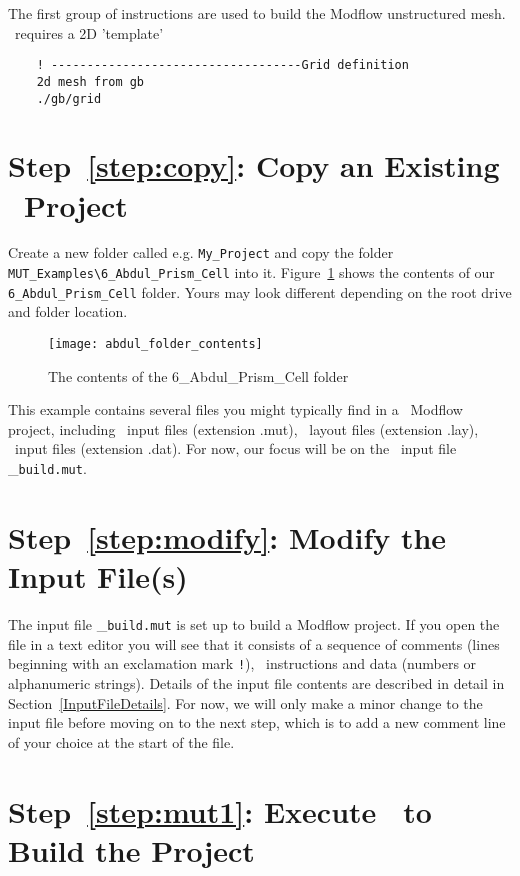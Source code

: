 The first group of instructions are used to build the Modflow unstructured mesh. \mut\ requires a 2D 'template'

\begin{verbatim}
    ! -----------------------------------Grid definition
    2d mesh from gb
    ./gb/grid
\end{verbatim}

\section*{Step~\ref{step:copy}: Copy an Existing \mut\ Project}

Create a new folder called e.g. \verb+My_Project+ and copy the folder \verb+MUT_Examples\6_Abdul_Prism_Cell+ into it.
Figure~\ref{fig:my_project} shows the contents of our \verb+6_Abdul_Prism_Cell+ folder.  Yours may look different depending on the root drive and folder location.
\begin{figure}[h!]
    \centering
    \texttt{[image: abdul\_folder\_contents]}
    \caption{The contents of the 6\_Abdul\_Prism\_Cell folder}
    \label{fig:my_project}
\end{figure}

This example contains several files you might typically find in a \mut\ Modflow project, including \mut\ input files (extension .mut), \tecplot\ layout files (extension .lay), \tecplot\ input files (extension .dat).  For now, our focus will be on the \mut\ input file \_\verb+build.mut+.

\section*{Step~\ref{step:modify}: Modify the Input File(s)}
The input file \_\verb+build.mut+ is set up to build a Modflow project.  If you open the file in a text editor you will see that it consists of a sequence of comments (lines beginning with an exclamation mark \verb+!+), \mut\ instructions and data (numbers or alphanumeric strings).  Details of the input file contents are described in detail in Section~\ref{InputFileDetails}.  For now, we will only make a minor change to the input file before moving on to the next step, which is to add a new comment line of your choice at the start of the file.

\section*{Step~\ref{step:mut1}: Execute \mut\ to Build the Project}



